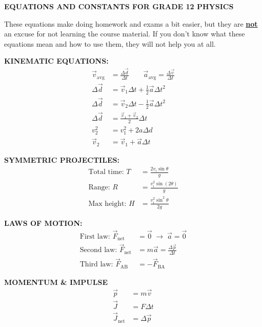 \documentclass[11pt]{article}
\newcommand{\sk}{\quad\quad}
\begin{document}
\begin{center}
  {\large{\textbf{EQUATIONS AND CONSTANTS FOR GRADE 12 PHYSICS}}}
\end{center}
These equations make doing homework and exams a bit easier, but they are
\underline{\textbf{not}} an excuse for not learning the course material. If
you don't know what these equations mean and how to use them, they will not
help you at all. %

\begin{multicols*}{3}
  \textbf{KINEMATIC EQUATIONS:}
  \begin{align*}
    \vec v_\text{avg} &=\frac{\Delta\vec d}{\Delta t}\sk
    \vec a_\text{avg} =\frac{\Delta\vec v}{\Delta t}\\
    \Delta\vec d &=\vec v_1\Delta t + \frac12\vec a\Delta t^2\\
    \Delta\vec d &=\vec v_2\Delta t - \frac12\vec a\Delta t^2\\
    \Delta\vec d &=\frac{\vec v_1+\vec v_2}2 \Delta t\\
    v_2^2 &= v_1^2+ 2a\Delta d\\
    \vec v_2 &= \vec v_1+\vec a \Delta t
  \end{align*}

  \textbf{SYMMETRIC PROJECTILES:}
  \begin{align*}
    \text{Total time: }T &= \frac{2v_i\sin\theta}g\\
    \text{Range: }R &= \frac{v_i^2\sin(2\theta)}g\\
    \text{Max height: }H &= \frac{v_i^2\sin^2\theta}{2g}
  \end{align*}

  \textbf{LAWS OF MOTION:}
  \begin{align*}
    \text{First law: }\vec F_\text{net} &=
    \vec0\;\rightarrow\;\vec a=\vec 0\\
    \text{Second law: }\vec F_\text{net} &=
    m\vec a=\frac{\Delta\vec p}{\Delta t}\\
    \text{Third law: }\vec F_\text{AB} &= -\vec F_\text{BA}
  \end{align*}

  \textbf{MOMENTUM \& IMPULSE}
  \begin{align*}
    \vec p &= m\vec v\\
    \vec J &= F\Delta t\\
    \vec J_\text{net} &= \Delta\vec p
  \end{align*}



\end{multicols*}
\end{document}
